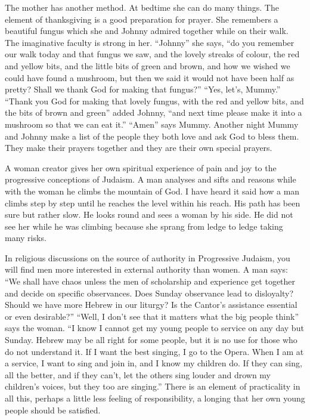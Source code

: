 The mother has another method. At bedtime she can do
many things. The element of thanksgiving is a good
preparation for prayer. She remembers a beautiful fungus
which she and Johnny admired together while on their walk.
The imaginative faculty is strong in her. ``Johnny'' she
says, ``do you remember our walk today and that fungus we
saw, and the lovely streaks of colour, the red and yellow
bits, and the little bits of green and brown, and how we
wished we could have found a mushroom, but then we said it
would not have been half as pretty? Shall we thank God
for making that fungus?'' ``Yes, let's, Mummy.'' ``Thank you
God for making that lovely fungus, with the red and yellow
bits, and the bits of brown and green'' added Johnny, ``and
next time please make it into a mushroom so that we can eat
it.'' ``Amen'' says Mummy. Another night Mummy and Johnny
make a list of the people they both love and ask God to
bless them. They make their prayers together and they are
their own special prayers.

A woman creator gives her own spiritual experience of
pain and joy to the progressive conceptions of Judaism. A
man analyses and sifts and reasons while with the woman he
climbs the mountain of God. I have heard it said how a man
climbs step by step until he reaches the level within his
reach. His path has been sure but rather slow. He looks
round and sees a woman by his side. He did not see her
while he was climbing because she sprang from ledge to
ledge taking many risks.

In religious discussions on the source of authority in
Progressive Judaism, you will find men more interested in
external authority than women. A man says: ``We shall have
chaos unless the men of scholarship and experience get
together and decide on specific observances. Does Sunday
observance lead to disloyalty? Should we have more Hebrew
in our liturgy? Is the Cantor's assistance essential or
even desirable?'' ``Well, I don't see that it matters what
the big people think'' says the woman. ``I know I cannot get
my young people to service on any day but Sunday. Hebrew
may be all right for some people, but it is no use for
those who do not understand it. If I want the best
singing, I go to the Opera. When I am at a service, I want
to sing and join in, and I know my children do. If they
can sing, all the better, and if they can't, let the others
sing louder and drown my children's voices, but they too
are singing.'' There is an element of practicality in all
this, perhaps a little less feeling of responsibility, a
longing that her own young people should be satisfied.

